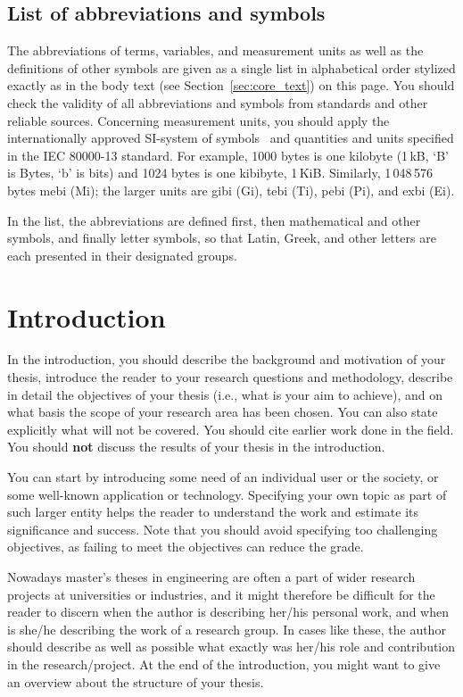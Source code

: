 \subsection{List of abbreviations and symbols}

The abbreviations of terms, variables, and measurement units as well as
the definitions of other symbols are given as a single list in
alphabetical order stylized exactly as in the body text (see
Section~\ref{sec:core_text}) on this page. You should check the validity
of all abbreviations and symbols from standards and other reliable
sources. Concerning measurement units, you should apply the
internationally approved SI-system of symbols~\cite{siopas,
systemofunits} and quantities and units specified in the IEC 80000-13
standard. For example, 1000 bytes is one kilobyte (1\,kB, `B' is Bytes,
`b' is bits) and 1024 bytes is one kibibyte, 1\,KiB. Similarly, 1\,048\,576 bytes mebi (Mi); the larger units are gibi (Gi), tebi (Ti), pebi
(Pi), and exbi (Ei).

In the list, the abbreviations are defined first, then mathematical and other symbols, and finally letter symbols, so that Latin, Greek, and other letters are each presented in their designated groups. 

\section{Introduction}

In the introduction, you should describe the background and motivation of your thesis, introduce the reader to your research questions and methodology, describe in detail the objectives of your thesis (i.e., what is your aim to achieve), and on what basis the scope of your research area has been chosen. You can also state explicitly what will not be covered. You should cite earlier work done in the field. You should \textbf{not} discuss the results of your thesis in the introduction.

You can start by introducing some need of an individual user or the society, or some well-known application or technology. Specifying your own topic as part of such larger entity helps the reader to understand the work and estimate its significance and success. Note that you should avoid specifying too challenging objectives, as failing to meet the objectives can reduce the grade.

Nowadays master’s theses in engineering are often a part of wider research projects at universities or industries, and it might therefore be difficult for the reader to discern when the author is describing her/his personal work, and when is she/he describing the work of a research group. In cases like these, the author should describe as well as possible what exactly was her/his role and contribution in the research/project. At the end of the introduction, you might want to give an overview about the structure of your thesis.

